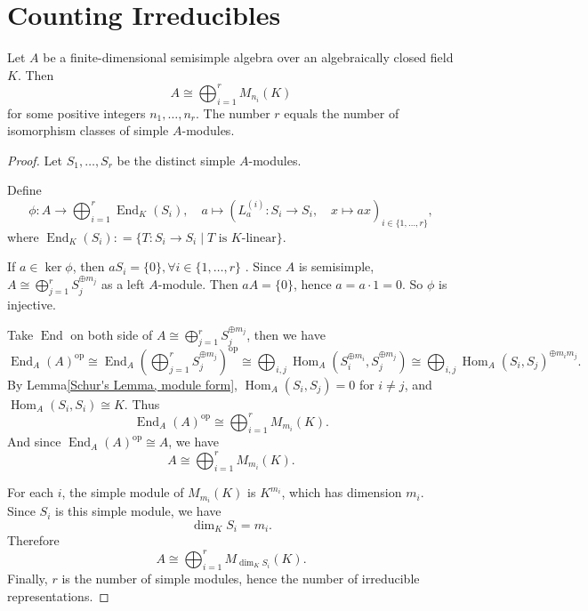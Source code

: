 \chapter{Counting Irreducibles}

\begin{thm}
\label{Artin--Wedderburn, algebraically closed case}
Let \(A\) be a finite-dimensional semisimple algebra over an algebraically closed field \(K\). Then
\[
A \cong \bigoplus_{i=1}^r M_{n_i}(K)
\]
for some positive integers \(n_1, \dots, n_r\). The number \(r\) equals the number of isomorphism classes of simple \(A\)-modules.
\end{thm}

\begin{proof}
Let \(S_1, \dots, S_r\) be the distinct simple \(A\)-modules.


Define
\[
\phi: A \to \bigoplus_{i=1}^r \operatorname{End}_K(S_i), \quad a\mapsto(L_a^{(i)}: S_i\to S_i,\quad x\mapsto ax)_{i\in \{1,\dots,r\}},
\]
where $\operatorname{End}_K(S_i): = \{ T: S_i\to S_i \mid T \text{ is } K\text{-linear} \}$.

If \(a \in \ker \phi\), then \(aS_i=\{0\},\forall i\in \{1,\dots, r\}\) . Since $A$ is semisimple, \(A \cong \bigoplus_{j=1}^r S_j^{\oplus m_j}\) as a left \(A\)-module. Then \(aA=\{0\}\), hence \(a = a\cdot1=0\). So \(\phi\) is injective.

Take $\operatorname{End}$ on both side of \(A \cong \bigoplus_{j=1}^r S_j^{\oplus m_j}\), then we have
\[
\operatorname{End}_A(A)^{\mathrm{op}} \cong \operatorname{End}_A(\bigoplus_{j=1}^r S_j^{\oplus m_j})^{\mathrm{op}}\cong\bigoplus_{i,j} \operatorname{Hom}_A(S_i^{\oplus m_i}, S_j^{\oplus m_j})\cong\bigoplus_{i,j} \operatorname{Hom}_A(S_i, S_j)^{\oplus m_i m_j}.
\]
By Lemma\ref{Schur's Lemma, module form}, \(\operatorname{Hom}_A(S_i, S_j) = 0\) for \(i \neq j\), and \(\operatorname{Hom}_A(S_i, S_i) \cong K\). Thus
\[
\operatorname{End}_A(A)^{\mathrm{op}} \cong \bigoplus_{i=1}^r M_{m_i}(K).
\]
And since \(\operatorname{End}_A(A)^{\mathrm{op}} \cong A\), we have
\[
A \cong \bigoplus_{i=1}^r M_{m_i}(K).
\]


For each \(i\), the simple module of \(M_{m_i}(K)\) is \(K^{m_i}\), which has dimension \(m_i\). Since \(S_i\) is this simple module, we have
\[
 \dim_K S_i = m_i.
\]Therefore
\[
A \cong \bigoplus_{i=1}^r M_{ \dim_K S_i}(K).
\]
Finally, \(r\) is the number of simple modules, hence the number of irreducible representations.
\end{proof}

